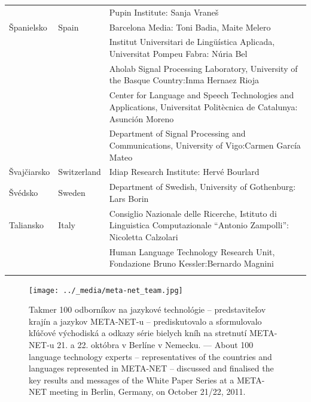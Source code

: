 \begin{longtable}{@{}llp{113mm}@{}}
  & & Pupin Institute: Sanja Vraneš \\ \addlinespace  
  Španielsko & \textcolor{grey1}{Spain} & Barcelona Media: Toni Badia, Maite Melero \\ \addlinespace 
  & & Institut Universitari de Lingüística Aplicada, Universitat Pompeu Fabra: Núria Bel \\ \addlinespace 
  & & Aholab Signal Processing Laboratory, University of the Basque Country:\newline Inma Hernaez Rioja \\ \addlinespace 
  & & Center for Language and Speech Technologies and Applications, Universitat Politècnica de Catalunya:  Asunción Moreno \\ \addlinespace 
  & & Department of Signal Processing and Communications, University of Vigo:\newline Carmen García Mateo \\ \addlinespace 
  Švajčiarsko & \textcolor{grey1}{Switzerland} & Idiap Research Institute: Hervé Bourlard \\ \addlinespace 
  Švédsko & \textcolor{grey1}{Sweden} & Department of Swedish, University of Gothenburg: Lars Borin \\ \addlinespace 
  Taliansko & \textcolor{grey1}{Italy} & Consiglio Nazionale delle Ricerche, Istituto di Linguistica Computazionale “Antonio Zampolli”: Nicoletta Calzolari\\ \addlinespace
  & & Human Language Technology Research Unit, Fondazione Bruno Kessler:\newline Bernardo Magnini\\ \addlinespace 
\end{longtable}
\normalsize

\renewcommand*{\figureformat}{}
\renewcommand*{\captionformat}{}

\begin{figure}[htbp]
  \center
  \texttt{[image: ../\_media/meta-net\_team.jpg]}
  \caption{Takmer 100 odborníkov na jazykové technológie – predstaviteľov krajín a jazykov META-NET-u – prediskutovalo a sformulovalo kľúčové východiská a odkazy série bielych kníh na stretnutí META-NET-u 21. a 22. októbra v Berlíne v Nemecku. --- \textcolor{grey1}{About 100 language technology experts -- representatives of the countries and languages represented in META-NET -- discussed and finalised the key results and messages of the White Paper Series at a META-NET meeting in Berlin, Germany, on October 21/22, 2011.}}
  \medskip
\end{figure}


